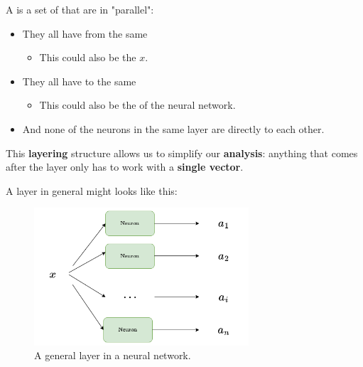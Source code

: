         \begin{definition}
            A  is a set of  that are in "parallel":
            \begin{itemize}
                \item They all have  from the same 
                    \begin{itemize}
                        \item This  could also be the  $x$.
                    \end{itemize}
                
                \item They all have  to the same 
                    \begin{itemize}
                        \item This  could also be the  of the neural network.
                    \end{itemize}
                
                \item And none of the neurons in the same layer are directly  to each other.
            \end{itemize}
        \end{definition}
        
        This \textbf{layering} structure allows us to simplify our \textbf{analysis}: anything that comes after the layer only has to work with a \textbf{single vector}.
        
        A layer in general might looks like this:
        
        \begin{figure}[H]
            \centering
            \includegraphics[width=80mm,scale=0.4]{images/nn_images/general_layer.png}
            \caption*{A general layer in a neural network.}
        \end{figure}
        
